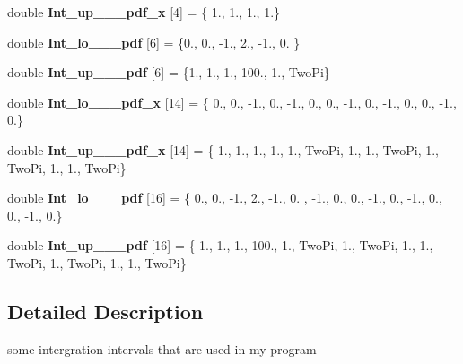 \begin{DoxyCompactItemize}
\item 
\hypertarget{namespaceIntLimits_a405d520ea75f6e1869cf105361a32a1e}{double {\bfseries Int\-\_\-up\-\_\-\_\-\_\-pdf\-\_\-x} \mbox{[}4\mbox{]} = \{ 1., 1., 1., 1.\}}\label{namespaceIntLimits_a405d520ea75f6e1869cf105361a32a1e}

\item 
\hypertarget{namespaceIntLimits_ad43ecb88ae590bc86f805609065415dc}{double {\bfseries Int\-\_\-lo\-\_\-\_\-\_\-pdf} \mbox{[}6\mbox{]} = \{0., 0., -\/1., 2., -\/1., 0. \}}\label{namespaceIntLimits_ad43ecb88ae590bc86f805609065415dc}

\item 
\hypertarget{namespaceIntLimits_a2d3fd9f962096bdb83ddde6e339b11a3}{double {\bfseries Int\-\_\-up\-\_\-\_\-\_\-pdf} \mbox{[}6\mbox{]} = \{1., 1., 1., 100., 1., Two\-Pi\}}\label{namespaceIntLimits_a2d3fd9f962096bdb83ddde6e339b11a3}

\item 
\hypertarget{namespaceIntLimits_a0bd33a34c3322bc5beb22dcff8ff5fea}{double {\bfseries Int\-\_\-lo\-\_\-\_\-\_\-pdf\-\_\-x} \mbox{[}14\mbox{]} = \{ 0., 0., -\/1., 0., -\/1., 0., 0., -\/1., 0., -\/1., 0., 0., -\/1., 0.\}}\label{namespaceIntLimits_a0bd33a34c3322bc5beb22dcff8ff5fea}

\item 
\hypertarget{namespaceIntLimits_a3d36c9fbb051e0f30cbdfc7b36894bb2}{double {\bfseries Int\-\_\-up\-\_\-\_\-\_\-pdf\-\_\-x} \mbox{[}14\mbox{]} = \{ 1., 1., 1., 1., 1., Two\-Pi, 1., 1., Two\-Pi, 1., Two\-Pi, 1., 1., Two\-Pi\}}\label{namespaceIntLimits_a3d36c9fbb051e0f30cbdfc7b36894bb2}

\item 
\hypertarget{namespaceIntLimits_a8f5f2b2d899990f9914564f8b4d37e1b}{double {\bfseries Int\-\_\-lo\-\_\-\_\-\_\-pdf} \mbox{[}16\mbox{]} = \{ 0., 0., -\/1., 2., -\/1., 0. , -\/1., 0., 0., -\/1., 0., -\/1., 0., 0., -\/1., 0.\}}\label{namespaceIntLimits_a8f5f2b2d899990f9914564f8b4d37e1b}

\item 
\hypertarget{namespaceIntLimits_a5e31e056fef4f98dcdd589c1d604fa86}{double {\bfseries Int\-\_\-up\-\_\-\_\-\_\-pdf} \mbox{[}16\mbox{]} = \{ 1., 1., 1., 100., 1., Two\-Pi, 1., Two\-Pi, 1., 1., Two\-Pi, 1., Two\-Pi, 1., 1., Two\-Pi\}}\label{namespaceIntLimits_a5e31e056fef4f98dcdd589c1d604fa86}

\end{DoxyCompactItemize}


\subsection{Detailed Description}
some intergration intervals that are used in my program 